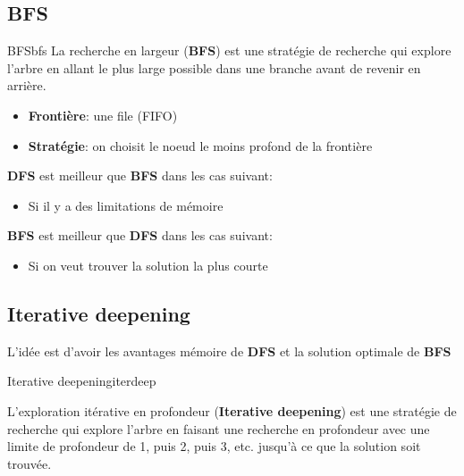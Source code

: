 \documentclass[a4paper, 12pt]{extarticle}
\begin{document}
\subsection{BFS} %
\label{sub:bfs} 

\begin{definition}{BFS}{bfs}
    La recherche en largeur (\textbf{BFS}) est une stratégie de recherche qui explore l'arbre en allant le plus large possible dans une branche avant de revenir en arrière. 
    \begin{itemize}
        \item \textbf{Frontière}: une file (FIFO)
        \item \textbf{Stratégie}: on choisit le noeud le moins profond de la frontière
    \end{itemize} 
\end{definition} 

\textbf{DFS} est meilleur que \textbf{BFS} dans les cas suivant: 
\begin{itemize}
    \item Si il y a des limitations de mémoire 
\end{itemize}

\textbf{BFS} est meilleur que \textbf{DFS} dans les cas suivant: 
\begin{itemize}
    \item Si on veut trouver la solution la plus courte
\end{itemize}

\subsection{Iterative deepening} %
\label{sub:iterative_deepening}
\begin{note}
    L'idée est d'avoir les avantages mémoire de \textbf{DFS} et la solution optimale de \textbf{BFS}
\end{note}

\begin{definition}{Iterative deepening}{iterdeep}

    L'exploration itérative en profondeur (\textbf{Iterative deepening}) est une stratégie de 
    recherche qui explore l'arbre en faisant une recherche en profondeur avec une limite de profondeur de 
    1, puis 2, puis 3, etc. jusqu'à ce que la solution soit trouvée.


\end{definition}
\end{document}
